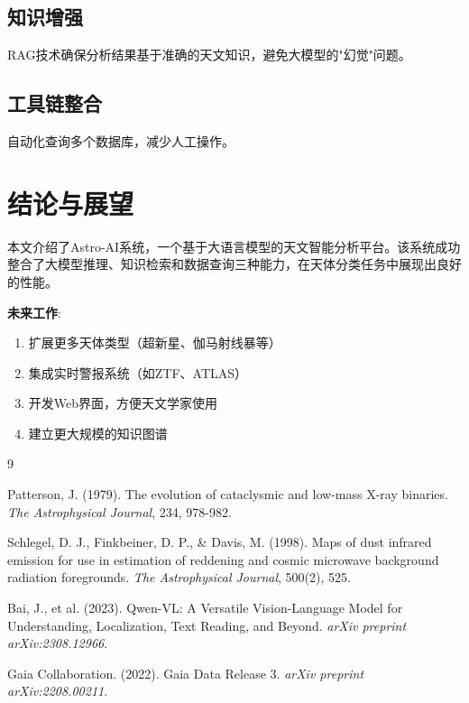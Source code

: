 \documentclass[a4paper,11pt]{article}
\begin{document}
\subsection{知识增强}

RAG技术确保分析结果基于准确的天文知识，避免大模型的"幻觉"问题。

\subsection{工具链整合}

自动化查询多个数据库，减少人工操作。

\section{结论与展望}

本文介绍了Astro-AI系统，一个基于大语言模型的天文智能分析平台。该系统成功整合了大模型推理、知识检索和数据查询三种能力，在天体分类任务中展现出良好的性能。

\textbf{未来工作}:
\begin{enumerate}
    \item 扩展更多天体类型（超新星、伽马射线暴等）
    \item 集成实时警报系统（如ZTF、ATLAS）
    \item 开发Web界面，方便天文学家使用
    \item 建立更大规模的知识图谱
\end{enumerate}

\begin{thebibliography}{9}

Patterson, J. (1979). 
The evolution of cataclysmic and low-mass X-ray binaries. 
\textit{The Astrophysical Journal}, 234, 978-982.

Schlegel, D. J., Finkbeiner, D. P., \& Davis, M. (1998). 
Maps of dust infrared emission for use in estimation of reddening and cosmic microwave background radiation foregrounds. 
\textit{The Astrophysical Journal}, 500(2), 525.

Bai, J., et al. (2023). 
Qwen-VL: A Versatile Vision-Language Model for Understanding, Localization, Text Reading, and Beyond. 
\textit{arXiv preprint arXiv:2308.12966}.

Gaia Collaboration. (2022). 
Gaia Data Release 3. 
\textit{arXiv preprint arXiv:2208.00211}.

\end{thebibliography}
\end{document}

